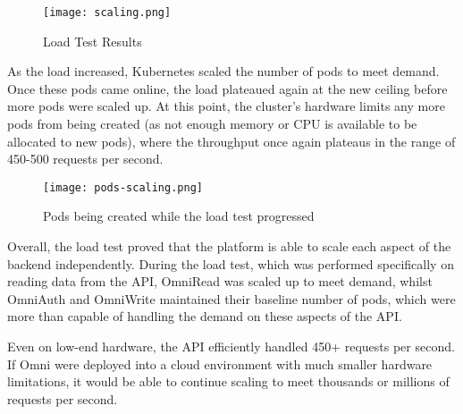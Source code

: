\begin{figure}[htbp]
\texttt{[image: scaling.png]}
\centering
\caption{Load Test Results}
\label{fig:load-test-results}
\end{figure}

As the load increased, Kubernetes scaled the number of pods to meet demand. Once these pods came online, the load plateaued again at the new ceiling before more pods were scaled up.
At this point, the cluster's hardware limits any more pods from being created (as not enough memory or CPU is available to be allocated to new pods), where the throughput once again plateaus in the range of 450-500 requests per second. 

\begin{figure}[htbp]
\texttt{[image: pods-scaling.png]}
\centering
\caption{Pods being created while the load test progressed}
\label{fig:load-test-pods-scaling}
\end{figure}

Overall, the load test proved that the platform is able to scale each aspect of the backend independently.
During the load test, which was performed specifically on reading data from the API, OmniRead was scaled up to meet demand, whilst OmniAuth and OmniWrite maintained their baseline number of pods, which were more than capable of handling the demand on these aspects of the API. 

Even on low-end hardware, the API efficiently handled 450+ requests per second.
If Omni were deployed into a cloud environment with much smaller hardware limitations, it would be able to continue scaling to meet thousands or millions of requests per second.
